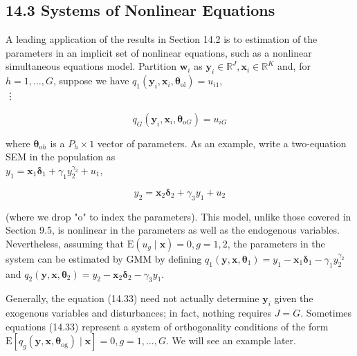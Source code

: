 \documentclass[10pt]{article}
\begin{document}
\subsection*{14.3 Systems of Nonlinear Equations}
A leading application of the results in Section 14.2 is to estimation of the parameters in an implicit set of nonlinear equations, such as a nonlinear simultaneous equations model. Partition $\mathbf{w}_{i}$ as $\mathbf{y}_{i} \in \mathbb{R}^{J}, \mathbf{x}_{i} \in \mathbb{R}^{K}$ and, for $h=1, \ldots, G$, suppose we have $q_{1}\left(\mathbf{y}_{i}, \mathbf{x}_{i}, \boldsymbol{\theta}_{\mathrm{ol}}\right)=u_{i 1}$,\\
⋮


\begin{equation*}
q_{G}\left(\mathbf{y}_{i}, \mathbf{x}_{i}, \boldsymbol{\theta}_{\mathrm{o} G}\right)=u_{i G} \tag{14.33}
\end{equation*}


where $\boldsymbol{\theta}_{\mathrm{o} h}$ is a $P_{h} \times 1$ vector of parameters. As an example, write a two-equation SEM in the population as\\
$y_{1}=\mathbf{x}_{1} \boldsymbol{\delta}_{1}+\gamma_{1} y_{2}^{\gamma_{2}}+u_{1}$,


\begin{equation*}
y_{2}=\mathbf{x}_{2} \boldsymbol{\delta}_{2}+\gamma_{3} y_{1}+u_{2} \tag{14.34}
\end{equation*}


(where we drop "o" to index the parameters). This model, unlike those covered in Section 9.5, is nonlinear in the parameters as well as the endogenous variables. Nevertheless, assuming that $\mathrm{E}\left(u_{g} \mid \mathbf{x}\right)=0, g=1,2$, the parameters in the system can be estimated by GMM by defining $q_{1}\left(\mathbf{y}, \mathbf{x}, \boldsymbol{\theta}_{1}\right)=y_{1}-\mathbf{x}_{1} \boldsymbol{\delta}_{1}-\gamma_{1} y_{2}^{\gamma_{2}}$ and $q_{2}\left(\mathbf{y}, \mathbf{x}, \boldsymbol{\theta}_{2}\right)= y_{2}-\mathbf{x}_{2} \boldsymbol{\delta}_{2}-\gamma_{3} y_{1}$.

Generally, the equation (14.33) need not actually determine $\mathbf{y}_{i}$ given the exogenous variables and disturbances; in fact, nothing requires $J=G$. Sometimes equations (14.33) represent a system of orthogonality conditions of the form $\mathrm{E}\left[q_{g}\left(\mathbf{y}, \mathbf{x}, \boldsymbol{\theta}_{\mathrm{og}}\right) \mid \mathbf{x}\right]= 0, g=1, \ldots, G$. We will see an example later.
\end{document}
